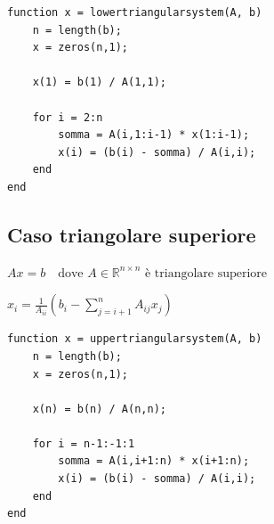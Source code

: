 \documentclass[12pt,a4paper]{article}
\begin{document}
\begin{lstlisting}
function x = lowertriangularsystem(A, b)
    n = length(b);
    x = zeros(n,1);
    
    x(1) = b(1) / A(1,1);
    
    for i = 2:n
        somma = A(i,1:i-1) * x(1:i-1);
        x(i) = (b(i) - somma) / A(i,i);
    end
end
\end{lstlisting}


\subsection*{Caso triangolare superiore}
\begin{flushleft}
$A x = b \quad \text{dove } A \in \mathbb{R}^{n \times n} \text{ è triangolare superiore}$

\vspace{0.5em}

$\displaystyle
x_i = \frac{1}{A_{ii}} \left(b_i - \sum_{j=i+1}^{n} A_{ij} x_j \right)
$
\end{flushleft}

\begin{lstlisting}
function x = uppertriangularsystem(A, b)
    n = length(b);
    x = zeros(n,1);
    
    x(n) = b(n) / A(n,n);
    
    for i = n-1:-1:1
        somma = A(i,i+1:n) * x(i+1:n);
        x(i) = (b(i) - somma) / A(i,i);
    end
end
\end{lstlisting}
\end{document}
